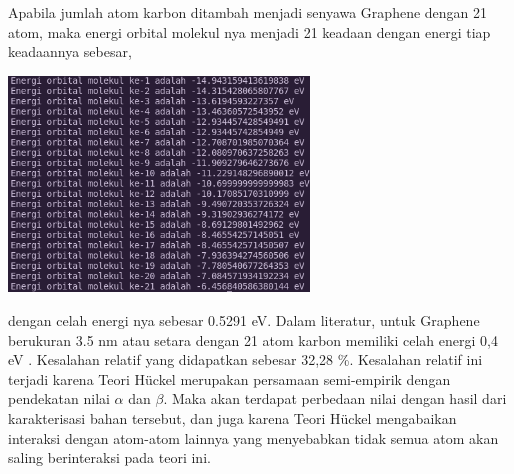 \documentclass[12pt,a4paper]{report}
\begin{document}
Apabila jumlah atom karbon ditambah menjadi senyawa Graphene dengan 21 atom, maka energi orbital molekul nya menjadi 21 keadaan dengan energi tiap keadaannya sebesar,
\begin{center}
	\includegraphics[width=8cm]{gambar/graphene21_energy.png}
	\label{graphene21_energy}
\end{center}
dengan celah energi nya sebesar 0.5291 eV. Dalam literatur, untuk Graphene berukuran 3.5 nm atau setara dengan 21 atom karbon memiliki celah energi 0,4 eV \cite{Jeon2013}. Kesalahan relatif yang didapatkan sebesar 32,28 \%. Kesalahan relatif ini terjadi karena Teori Hückel merupakan persamaan semi-empirik dengan pendekatan nilai $\alpha$ dan $\beta$. Maka akan terdapat perbedaan nilai dengan hasil dari karakterisasi bahan tersebut, dan juga karena Teori Hückel mengabaikan interaksi dengan atom-atom lainnya yang menyebabkan tidak semua atom akan saling berinteraksi pada teori ini.
\end{document}
